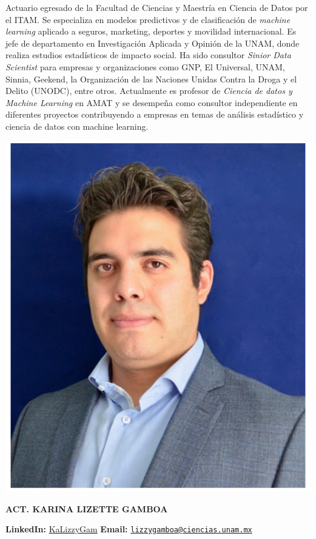 \documentclass[
]{book}
\begin{document}
Actuario egresado de la Facultad de Ciencias y Maestría en Ciencia de Datos por el ITAM.
Se especializa en modelos predictivos y de clasificación de \emph{machine learning} aplicado a seguros, marketing, deportes y movilidad internacional. Es jefe de departamento en Investigación Aplicada y Opinión de la UNAM, donde realiza estudios estadísticos de impacto social. Ha sido consultor \emph{Sinior Data Scientist} para empresas y organizaciones como GNP, El Universal, UNAM, Sinnia, Geekend, la Organización de las Naciones Unidas Contra la Droga y el Delito (UNODC), entre otros. Actualmente es profesor de \emph{Ciencia de datos y Machine Learning} en AMAT y se desempeña como consultor independiente en diferentes proyectos contribuyendo a empresas en temas de análisis estadístico y ciencia de datos con machine learning.

\begin{center}\includegraphics[width=6.57in]{img/00-presentacion/arturo} \end{center}

\textbf{ACT. KARINA LIZETTE GAMBOA}

\textbf{LinkedIn:} \href{https://www.linkedin.com/in/kalizzygam/}{KaLizzyGam}
\textbf{Email:} \href{mailto:lizzygamboa@ciencias.unam.mx}{\nolinkurl{lizzygamboa@ciencias.unam.mx}}
\end{document}
